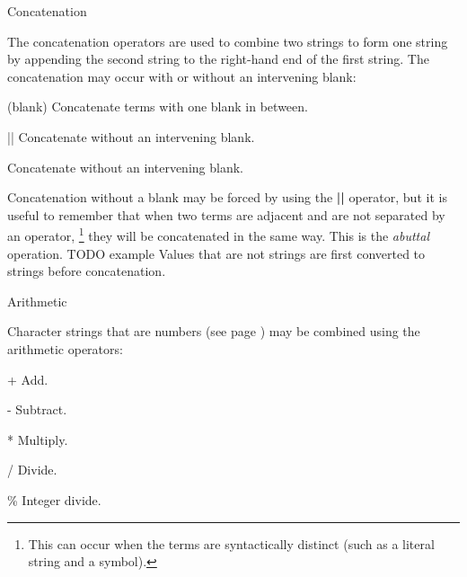 \begin{description}
\item{Concatenation}

The concatenation operators are used to combine two strings to form
one string by appending the second string to the right-hand end of the
first string.  The concatenation may occur with or without an
intervening blank:
\begin{description}
\item{(blank)}
Concatenate terms with one blank in between.
\item{||}
Concatenate without an intervening blank.
\item[(abuttal)]\label{refabut}
Concatenate without an intervening blank.
\end{description}
 Concatenation without a blank may be forced by using
the \textbf{||} operator, but it is useful to remember that
when two terms are adjacent and are not separated by an operator,
\footnote{
This can occur when the terms are syntactically distinct (such as a
literal string and a symbol).
}
they will be concatenated in the same way.
This is the \emph{abuttal} operation.
TODO example
 Values that are not strings are first converted to strings before
concatenation.
\item{Arithmetic}
\index{,}
\index{,}
\index{,}
\index{,}

Character strings that are  numbers (see page \pageref{refnumdef}) 
may be combined using the arithmetic operators:
\begin{description}
\item{+}
Add.
\item{-}
Subtract.
\item{*}
Multiply.
\item{/}
Divide.
\item{\%}
Integer divide.


\end{description}
\end{description}
